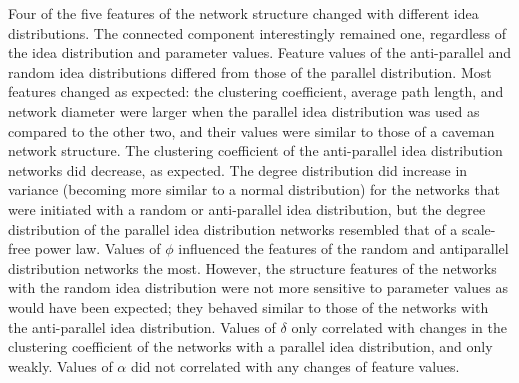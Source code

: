 \documentclass{beamer}
\begin{document}
\begin{frame}
Four of the five features of the network structure changed with different idea distributions. The connected component interestingly remained one, regardless of the idea distribution and parameter values. Feature values of the anti-parallel and random idea distributions differed from those of the parallel distribution. Most features changed as expected: the clustering coefficient, average path length, and network diameter were larger when the parallel idea distribution was used as compared to the other two, and their values were similar to those of a caveman network structure. The clustering coefficient of the anti-parallel idea distribution networks did decrease, as expected. The degree distribution did increase in variance (becoming more similar to a normal distribution) for the networks that were initiated with a random or anti-parallel idea distribution, but the degree distribution of the parallel idea distribution networks resembled that of a scale-free power law. Values of $\phi$ influenced the features of the random and antiparallel distribution networks the most. However, the structure features of the networks with the random idea distribution were not more sensitive to parameter values as would have been expected; they behaved similar to those of the networks with the anti-parallel idea distribution. Values of $\delta$ only correlated with changes in the clustering coefficient of the networks with a parallel idea distribution, and only weakly. Values of $\alpha$ did not correlated with any changes of feature values. 

\end{frame}
%
\begin{frame}
\end{frame}
%
\end{document}
